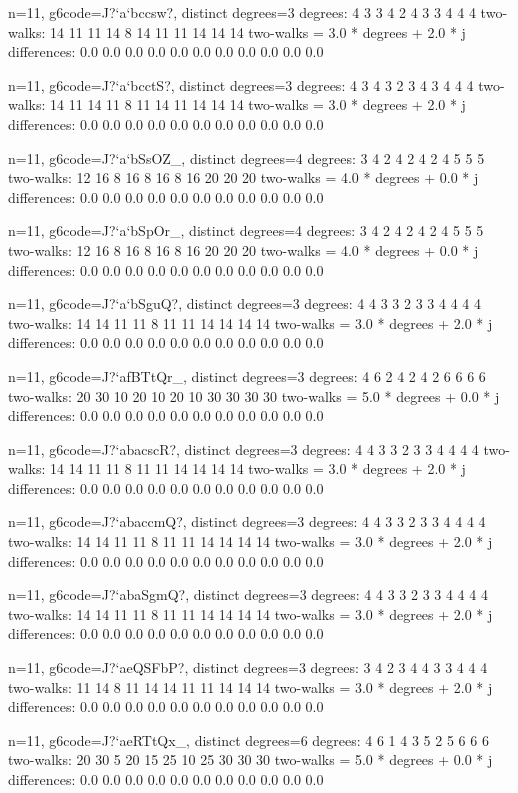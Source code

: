 {{{{{{{{{{{{{{{{{{n=11, g6code=J?`a`bccsw?, distinct degrees=3
degrees: 4 3 3 4 2 4 3 3 4 4 4 
two-walks: 14 11 11 14 8 14 11 11 14 14 14 
two-walks = 3.0 * degrees + 2.0 * j
differences: 0.0 0.0 0.0 0.0 0.0 0.0 0.0 0.0 0.0 0.0 0.0 

n=11, g6code=J?`a`bcctS?, distinct degrees=3
degrees: 4 3 4 3 2 3 4 3 4 4 4 
two-walks: 14 11 14 11 8 11 14 11 14 14 14 
two-walks = 3.0 * degrees + 2.0 * j
differences: 0.0 0.0 0.0 0.0 0.0 0.0 0.0 0.0 0.0 0.0 0.0 

n=11, g6code=J?`a`bSsOZ_, distinct degrees=4
degrees: 3 4 2 4 2 4 2 4 5 5 5 
two-walks: 12 16 8 16 8 16 8 16 20 20 20 
two-walks = 4.0 * degrees + 0.0 * j
differences: 0.0 0.0 0.0 0.0 0.0 0.0 0.0 0.0 0.0 0.0 0.0 

n=11, g6code=J?`a`bSpOr_, distinct degrees=4
degrees: 3 4 2 4 2 4 2 4 5 5 5 
two-walks: 12 16 8 16 8 16 8 16 20 20 20 
two-walks = 4.0 * degrees + 0.0 * j
differences: 0.0 0.0 0.0 0.0 0.0 0.0 0.0 0.0 0.0 0.0 0.0 

n=11, g6code=J?`a`bSguQ?, distinct degrees=3
degrees: 4 4 3 3 2 3 3 4 4 4 4 
two-walks: 14 14 11 11 8 11 11 14 14 14 14 
two-walks = 3.0 * degrees + 2.0 * j
differences: 0.0 0.0 0.0 0.0 0.0 0.0 0.0 0.0 0.0 0.0 0.0 

n=11, g6code=J?`afBTtQr_, distinct degrees=3
degrees: 4 6 2 4 2 4 2 6 6 6 6 
two-walks: 20 30 10 20 10 20 10 30 30 30 30 
two-walks = 5.0 * degrees + 0.0 * j
differences: 0.0 0.0 0.0 0.0 0.0 0.0 0.0 0.0 0.0 0.0 0.0 

n=11, g6code=J?`abacscR?, distinct degrees=3
degrees: 4 4 3 3 2 3 3 4 4 4 4 
two-walks: 14 14 11 11 8 11 11 14 14 14 14 
two-walks = 3.0 * degrees + 2.0 * j
differences: 0.0 0.0 0.0 0.0 0.0 0.0 0.0 0.0 0.0 0.0 0.0 

n=11, g6code=J?`abaccmQ?, distinct degrees=3
degrees: 4 4 3 3 2 3 3 4 4 4 4 
two-walks: 14 14 11 11 8 11 11 14 14 14 14 
two-walks = 3.0 * degrees + 2.0 * j
differences: 0.0 0.0 0.0 0.0 0.0 0.0 0.0 0.0 0.0 0.0 0.0 

n=11, g6code=J?`abaSgmQ?, distinct degrees=3
degrees: 4 4 3 3 2 3 3 4 4 4 4 
two-walks: 14 14 11 11 8 11 11 14 14 14 14 
two-walks = 3.0 * degrees + 2.0 * j
differences: 0.0 0.0 0.0 0.0 0.0 0.0 0.0 0.0 0.0 0.0 0.0 

n=11, g6code=J?`aeQSFbP?, distinct degrees=3
degrees: 3 4 2 3 4 4 3 3 4 4 4 
two-walks: 11 14 8 11 14 14 11 11 14 14 14 
two-walks = 3.0 * degrees + 2.0 * j
differences: 0.0 0.0 0.0 0.0 0.0 0.0 0.0 0.0 0.0 0.0 0.0 

n=11, g6code=J?`aeRTtQx_, distinct degrees=6
degrees: 4 6 1 4 3 5 2 5 6 6 6 
two-walks: 20 30 5 20 15 25 10 25 30 30 30 
two-walks = 5.0 * degrees + 0.0 * j
differences: 0.0 0.0 0.0 0.0 0.0 0.0 0.0 0.0 0.0 0.0 0.0 

}}}}}}}}}}}}}}}}}}
